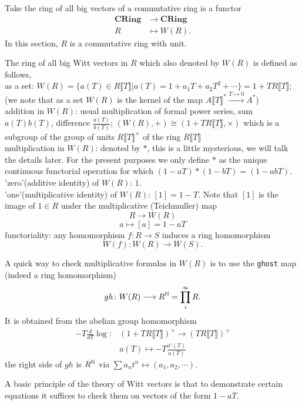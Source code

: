 Take the ring of all big vectors of a commutative ring is a functor 
\begin{align*}
\mathbf{CRing} &\longrightarrow \mathbf{CRing}\\
 R &\mapsto W(R).
\end{align*}
In this section, $R$ is a commutative ring with unit.
\begin{definition}
The ring of all big Witt vectors in $R$ which also denoted by $W(R)$ is defined as follows,\\
as a set: $W(R)=\{a(T)\in R\llbracket T\rrbracket | a(T)=1+a_1T+a_2T^2+\cdots\}=1+TR\llbracket T\rrbracket $; (we note that as a set $W(R)$ is the kernel of the map $A\llbracket T\rrbracket ^*\overset{T\mapsto 0}\longrightarrow A^*$)\\
addition in $W(R)$: usual multiplication of formal power series, sum $a(T)b(T)$, difference $\frac{a(T)}{b(T)}$; $(W(R),+)\cong (1+TR\llbracket T\rrbracket ,\times)$ which is a subgroup of the group of units $R\llbracket T\rrbracket ^{\times}$ of the ring $R\llbracket T\rrbracket $\\
multiplication in $W(R)$: denoted by $*$, this is a little mysterious, we will talk the details later. For the present purposes we only define $*$ as the unique continuous functorial operation for which $(1-aT)*(1-bT)=(1-abT)$.\\
'zero'(additive identity) of $W(R)$: $1$.\\
'one'(multiplicative identity) of $W(R)$: $[1]=1-T$. Note that $[1]$ is the image of $1\in R$ under the multiplicative (Teichmuller) map 
\[R\longrightarrow W(R)\]
\[a \mapsto [a]=1-aT\]
functoriality: any homomorphism $f\colon R \longrightarrow S$ induces a ring homomorphism 
\[W(f)\colon W(R) \longrightarrow W(S).\]
\end{definition}
A quick way to check multiplicative formulas in $W(R)$ is to use the \texttt{ghost} map (indeed a ring homomorphism)
\[gh\colon W(R)\longrightarrow R^{\mathbb{N}} =\prod_i^\infty R. \]
It is obtained from the abelian group homomorphism
\begin{align*}
-T \frac{d}{dT}\log \colon& (1+TR\llbracket T\rrbracket )^{\times} \longrightarrow (TR\llbracket T\rrbracket )^+\\
& a(T)\mapsto -T \frac{a'(T)}{a(T)}
\end{align*}
the right side of $gh$ is $R^{\mathbb{N}}$ via $\sum a_nt^n \longleftrightarrow (a_1,a_2,\cdots)$.

A basic principle of the theory of Witt vectors is that to demonstrate certain equations it suffices to check them on vectors of the form $1-aT$.
